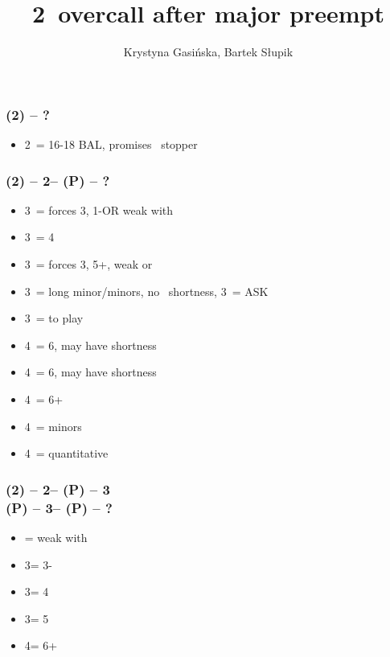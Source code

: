 \documentclass[12pt, a4paper]{article}
\title{2\ntx\ overcall after major preempt}
\author{Krystyna Gasińska, Bartek Słupik}
\begin{document}
\maketitle


\subsubsection*{(2\majs) -- ?}
\begin{itemize}
    \item 2\nt\ = 16-18 BAL, promises \majs\ stopper
\end{itemize}

\subsubsection*{(2\hearts) -- 2\nt -- (P) -- ?}
\begin{itemize}
    \item 3\clubs\ = forces 3\diams, 1-\hearts \gf OR weak with \diams
    \item 3\diams\ = 4\spades \gf
    \item 3\hearts\ = forces 3\spades, 5+\spades, weak or \gf
    \item 3\spades\ = long minor/minors, no \hearts\ shortness, 3\nt\ = ASK
    \item 3\nt\ = to play
    \item 4\clubs\ = 6\spades, may have shortness
    \item 4\diams\ = 6\spades, may have shortness
    \item 4\hearts\ = 6+\spades
    \item 4\spades\ = minors
    \item 4\nt\ = quantitative
\end{itemize}

\subsubsection*{(2\hearts) -- 2\nt -- (P) -- 3\clubs \\
                (P) -- 3\diams -- (P) -- ?}
\begin{itemize}
    \item \pass = weak with \diams
    \item 3\hearts = 3-\spades
    \item 3\spades = 4\spades
    \item 3\nt = 5\spades
    \item 4\clubs = 6+\spades
\end{itemize}
\end{document}
